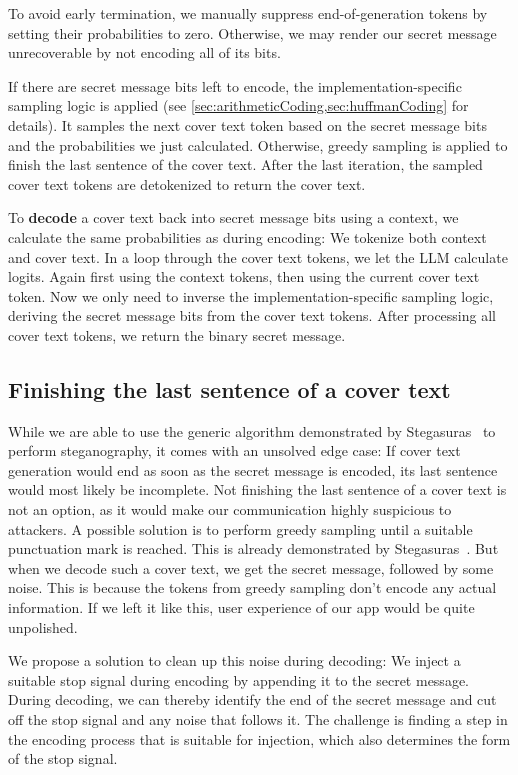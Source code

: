To avoid early termination, we manually suppress end-of-generation tokens by setting their probabilities to zero. Otherwise, we may render our secret message unrecoverable by not encoding all of its bits.

If there are secret message bits left to encode, the implementation-specific sampling logic is applied (see \cref{sec:arithmeticCoding,sec:huffmanCoding} for details). It samples the next cover text token based on the secret message bits and the probabilities we just calculated. Otherwise, greedy sampling is applied to finish the last sentence of the cover text. After the last iteration, the sampled cover text tokens are detokenized to return the cover text.

To \textbf{decode} a cover text back into secret message bits using a context, we calculate the same probabilities as during encoding: We tokenize both context and cover text. In a loop through the cover text tokens, we let the \gls{LLM} calculate logits. Again first using the context tokens, then using the current cover text token. Now we only need to inverse the implementation-specific sampling logic, deriving the secret message bits from the cover text tokens. After processing all cover text tokens, we return the binary secret message.

\subsection{Finishing the last sentence of a cover text}
\label{sec:finishingTheLastSentenceOfACoverText}
While we are able to use the generic algorithm demonstrated by Stegasuras~\cite{zieglerNeuralLinguisticSteganography2019} to perform steganography, it comes with an unsolved edge case: If cover text generation would end as soon as the secret message is encoded, its last sentence would most likely be incomplete. Not finishing the last sentence of a cover text is not an option, as it would make our communication highly suspicious to attackers. A possible solution is to perform greedy sampling until a suitable punctuation mark is reached. This is already demonstrated by Stegasuras~\cite{zieglerHarvardnlpNeuralSteganography2025}. But when we decode such a cover text, we get the secret message, followed by some noise. This is because the tokens from greedy sampling don't encode any actual information. If we left it like this, user experience of our app would be quite unpolished.

We propose a solution to clean up this noise during decoding: We inject a suitable stop signal during encoding by appending it to the secret message. During decoding, we can thereby identify the end of the secret message and cut off the stop signal and any noise that follows it. The challenge is finding a step in the encoding process that is suitable for injection, which also determines the form of the stop signal.

